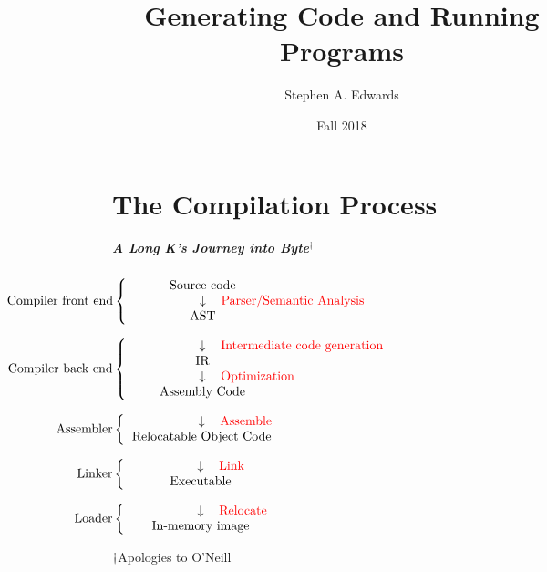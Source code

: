 \documentclass{plt}
\title{Generating Code and Running Programs}
\author{Stephen A. Edwards}
\institute{Columbia University}
\date{Fall 2018}
\begin{document}
\maketitle

\part{The Compilation Process}
\frame{\partpage}

\newcommand{\phase}[2]{
$\llap{\textrm{#1}}\left\{
\hbox to 10pc{\hfil
\begin{tabular}{c}
#2
\end{tabular}\hfil}
\right.$
}

\newcommand{\transform}[1]{
$\downarrow$\rlap{\hspace{1pc}\textcolor{red}{#1}}
}

\begin{frame}
  \frametitle{A Long K's Journey into Byte$^\dagger$}

\parskip=0pt
\begin{center}
\phase{Compiler front end}{
Source code \\
\transform{Parser/Semantic Analysis} \\
AST \\
}

\phase{Compiler back end}{
\transform{Intermediate code generation} \\
IR \\
\transform{Optimization} \\
Assembly Code \\
}

\phase{Assembler}{
\transform{Assemble} \\
Relocatable Object Code \\
}

\phase{Linker}{
\transform{Link} \\
Executable \\
}

\phase{Loader}{
\transform{Relocate} \\
In-memory image \\
}

\end{center}

{\footnotesize $\dagger$Apologies to O'Neill}

\end{frame}
\end{document}
